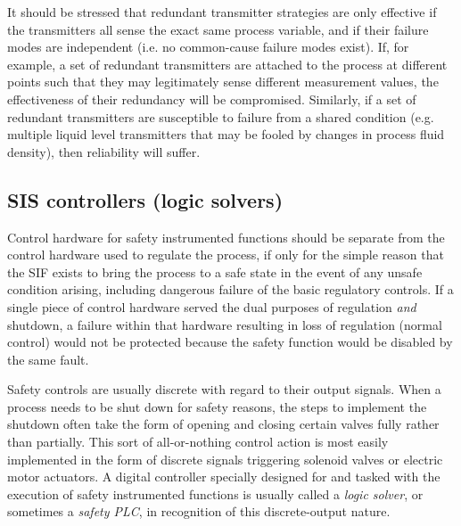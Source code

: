 \vskip 10pt

It should be stressed that redundant transmitter strategies are only effective if the transmitters all sense the exact same process variable, and if their failure modes are independent (i.e. no common-cause failure modes exist).  If, for example, a set of redundant transmitters are attached to the process at different points such that they may legitimately sense different measurement values, the effectiveness of their redundancy will be compromised.  Similarly, if a set of redundant transmitters are susceptible to failure from a shared condition (e.g. multiple liquid level transmitters that may be fooled by changes in process fluid density), then reliability will suffer.








\filbreak
\subsection{SIS controllers (logic solvers)}

Control hardware for safety instrumented functions should be separate from the control hardware used to regulate the process, if only for the simple reason that the SIF exists to bring the process to a safe state in the event of any unsafe condition arising, including dangerous failure of the basic regulatory controls.  If a single piece of control hardware served the dual purposes of regulation \textit{and} shutdown, a failure within that hardware resulting in loss of regulation (normal control) would not be protected because the safety function would be disabled by the same fault.

Safety controls are usually discrete with regard to their output signals.  When a process needs to be shut down for safety reasons, the steps to implement the shutdown often take the form of opening and closing certain valves fully rather than partially.  This sort of all-or-nothing control action is most easily implemented in the form of discrete signals triggering solenoid valves or electric motor actuators.  A digital controller specially designed for and tasked with the execution of safety instrumented functions is usually called a \textit{logic solver}, or sometimes a \textit{safety PLC}, in recognition of this discrete-output nature.      

